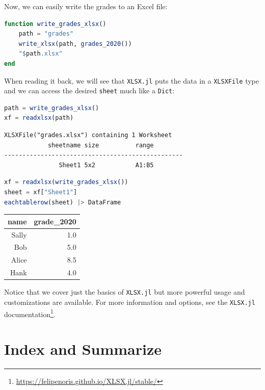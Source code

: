 \documentclass[
  notoc %
]{tufte-book}
\DeclareRobustCommand{\href}[2]{#2\footnote{\url{#1}}}
\newcommand{\passthrough}[1]{#1}
\begin{document}
Now, we can easily write the grades to an Excel file:

\begin{lstlisting}[language=Julia]
function write_grades_xlsx()
    path = "grades"
    write_xlsx(path, grades_2020())
    "$path.xlsx"
end
\end{lstlisting}

When reading it back, we will see that \passthrough{\lstinline!XLSX.jl!}
puts the data in a \passthrough{\lstinline!XLSXFile!} type and we can
access the desired \passthrough{\lstinline!sheet!} much like a
\passthrough{\lstinline!Dict!}:

\begin{lstlisting}[language=Julia]
path = write_grades_xlsx()
xf = readxlsx(path)
\end{lstlisting}

\begin{lstlisting}[language=Output]
XLSXFile("grades.xlsx") containing 1 Worksheet
            sheetname size          range        
-------------------------------------------------
               Sheet1 5x2           A1:B5        

\end{lstlisting}

\begin{lstlisting}[language=Julia]
xf = readxlsx(write_grades_xlsx())
sheet = xf["Sheet1"]
eachtablerow(sheet) |> DataFrame
\end{lstlisting}

\begin{longtable}[]{@{}rr@{}}
\toprule()
name & grade\_2020 \\
\midrule()
\endhead
Sally & 1.0 \\
Bob & 5.0 \\
Alice & 8.5 \\
Hank & 4.0 \\
\bottomrule()
\end{longtable}

Notice that we cover just the basics of
\passthrough{\lstinline!XLSX.jl!} but more powerful usage and
customizations are available. For more information and options, see the
\href{https://felipenoris.github.io/XLSX.jl/stable/}{\passthrough{\lstinline!XLSX.jl!}
documentation}.

\hypertarget{index-and-summarize}{%
\section{Index and Summarize}\label{index-and-summarize}}
\end{document}
